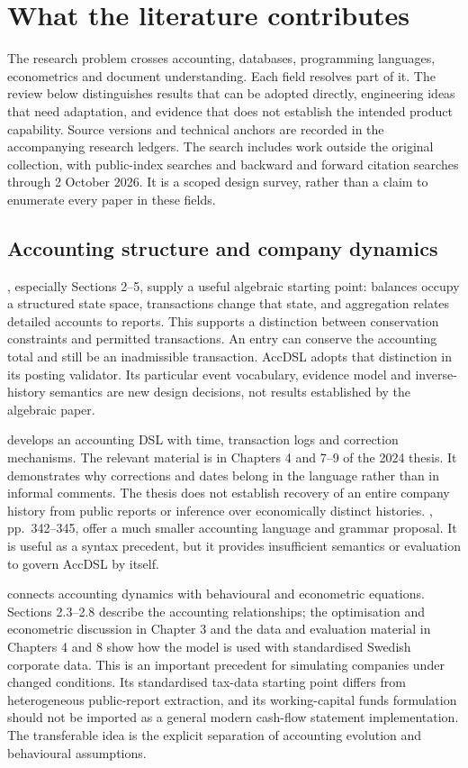 \chapter{What the literature contributes}
\label{ch:literature}

The research problem crosses accounting, databases, programming languages,
econometrics and document understanding. Each field resolves part of it. The
review below distinguishes results that can be adopted directly, engineering
ideas that need adaptation, and evidence that does not establish the intended
product capability. Source versions and technical anchors are recorded in the
accompanying research ledgers. The search includes work outside the original
collection, with public-index searches and backward and forward citation
searches through 2 October 2026. It is a scoped design survey, rather than a
claim to enumerate every paper in these fields.

\section{Accounting structure and company dynamics}

\citet{nehmer1997}, especially Sections 2--5, supply a useful algebraic
starting point: balances occupy a structured state space, transactions change
that state, and aggregation relates detailed accounts to reports. This supports
a distinction between conservation constraints and permitted transactions.
An entry can conserve the accounting total and still be an inadmissible
transaction. AccDSL adopts that distinction in its posting validator. Its
particular event vocabulary, evidence model and inverse-history semantics are
new design decisions, not results established by the algebraic paper.

\citet{doshi2024} develops an accounting DSL with time, transaction logs and
correction mechanisms. The relevant material is in Chapters 4 and 7--9 of the
2024 thesis.
It demonstrates why corrections and dates belong in the language rather than
in informal comments. The thesis does not establish recovery of an entire
company history from public reports or inference over economically distinct
histories. \citet{babcinetchi2022}, pp.~342--345, offer a much smaller accounting
language and grammar proposal. It is useful as a syntax precedent, but it
provides insufficient semantics or evaluation to govern AccDSL by itself.

\citet{shahnazarian2004} connects accounting dynamics with behavioural and
econometric equations. Sections 2.3--2.8 describe the accounting relationships;
the optimisation and econometric discussion in Chapter 3 and the data and
evaluation material in Chapters 4 and 8 show how the model is used with
standardised Swedish corporate data. This is an important precedent for
simulating companies under changed conditions. Its standardised tax-data
starting point differs from heterogeneous public-report extraction, and its
working-capital funds formulation should not be imported as a general modern
cash-flow statement implementation. The transferable idea is the explicit
separation of accounting evolution and behavioural assumptions.

